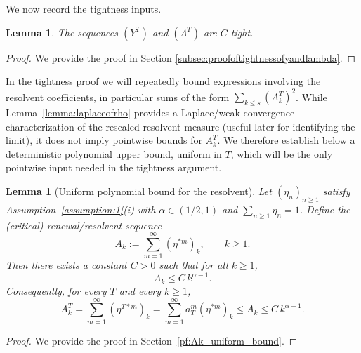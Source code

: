 \documentclass[letterpaper]{article}
\numberwithin{equation}{section}
\newtheorem{lemma}[theorem]{Lemma}
\theoremstyle{definition}
\theoremstyle{remark}
\begin{document}
We now record the tightness inputs.

\begin{lemma}\label{lemma:tightnessofyandlambda}
  The sequences $(Y^T)$ and $(\Lambda^T)$ are $C$-tight.
\end{lemma}

\begin{proof}
  We provide the proof in Section \ref{subsec:proofoftightnessofyandlambda}.
\end{proof}

{
In the tightness proof we will repeatedly bound expressions involving the resolvent coefficients,
in particular sums of the form $\sum_{k\le s}(A_k^T)^2$. While Lemma~\ref{lemma:laplaceofrho} provides a
Laplace/weak-convergence characterization of the rescaled resolvent measure (useful later for identifying the limit),
it does not imply pointwise bounds for $A_k^T$. We therefore establish below a deterministic polynomial upper bound,
uniform in $T$, which will be the only pointwise input needed in the tightness argument.

\begin{lemma}[Uniform polynomial bound for the resolvent]\label{lem:Ak_uniform_bound}
Let $(\eta_n)_{n\ge1}$ satisfy Assumption~\ref{assumption:1}(i) with $\alpha\in(1/2,1)$ and $\sum_{n\ge1}\eta_n=1$.
Define the (critical) renewal/resolvent sequence
\[
A_k:=\sum_{m=1}^{\infty}(\eta^{*m})_k,\qquad k\ge1.
\]
Then there exists a constant $C>0$ such that for all $k\ge1$,
\[
A_k \le C\,k^{\alpha-1}.
\]
Consequently, for every $T$ and every $k\ge1$,
\[
A_k^T=\sum_{m=1}^{\infty}(\eta^{T*m})_k=\sum_{m=1}^{\infty}a_T^m(\eta^{*m})_k\le A_k\le C\,k^{\alpha-1}.
\]
\end{lemma}

\begin{proof}
  We provide the proof in Section~\ref{pf:Ak_uniform_bound}.
\end{proof}
}
\end{document}
